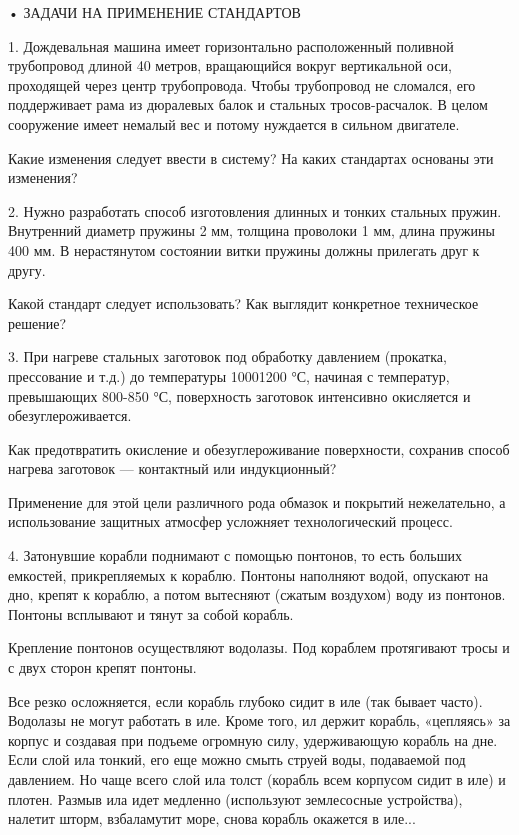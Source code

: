 • ЗАДАЧИ НА ПРИМЕНЕНИЕ СТАНДАРТОВ

1.  Дождевальная  машина  имеет горизонтально  расположенный  поливной
трубопровод  длиной 40  метров, вращающийся  вокруг вертикальной  оси,
проходящей через  центр трубопровода.  Чтобы трубопровод  не сломался,
его поддерживает рама из дюралевых балок и стальных тросов-расчалок. В
целом  сооружение  имеет немалый  вес  и  потому нуждается  в  сильном
двигателе.

Какие изменения следует ввести в систему? На каких стандартах основаны
эти изменения?

2.  Нужно разработать  способ изготовления  длинных и  тонких стальных
пружин.  Внутренний диаметр  пружины  2 мм,  толщина  проволоки 1  мм,
длина пружины  400 мм. В  нерастянутом состоянии витки  пружины должны
прилегать друг к другу.

Какой   стандарт  следует   использовать?   Как  выглядит   конкретное
техническое решение?

3. При  нагреве стальных заготовок под  обработку давлением (прокатка,
прессование и т.д.) до температуры  10001200 °С, начиная с температур,
превышающих 800-850 °С, поверхность  заготовок интенсивно окисляется и
обезуглероживается.

Как предотвратить окисление  и обезуглероживание поверхности, сохранив
способ нагрева заготовок — контактный или индукционный?

Применение  для   этой  цели   различного  рода  обмазок   и  покрытий
нежелательно,    а   использование    защитных   атмосфер    усложняет
технологический процесс.

4. Затонувшие  корабли поднимают с  помощью понтонов, то  есть больших
емкостей, прикрепляемых  к кораблю. Понтоны наполняют  водой, опускают
на дно, крепят к кораблю, а  потом вытесняют (сжатым воздухом) воду из
понтонов. Понтоны всплывают и тянут за собой корабль.


Крепление  понтонов осуществляют  водолазы.  Под кораблем  протягивают
тросы и с двух сторон крепят понтоны.

Все резко  осложняется, если корабль  глубоко сидит в иле  (так бывает
часто).  Водолазы не  могут  работать  в иле.  Кроме  того, ил  держит
корабль, «цепляясь»  за корпус и  создавая при подъеме  огромную силу,
удерживающую корабль на дне. Если слой ила тонкий, его еще можно смыть
струей воды,  подаваемой под давлением.  Но чаще всего слой  ила толст
(корабль всем корпусом сидит в иле) и плотен. Размыв ила идет медленно
(используют землесосные устройства),  налетит шторм, взбаламутит море,
снова корабль окажется в иле...

